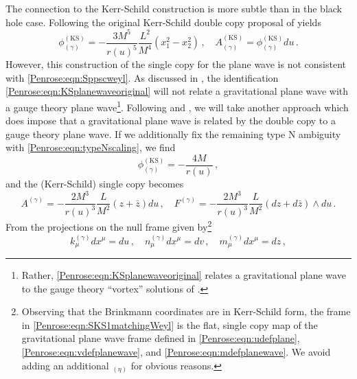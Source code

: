 The connection to the Kerr-Schild construction is more subtle than in the black hole case. Following the original Kerr-Schild double copy proposal of \cite{Monteiro:2014cda} yields
\begin{equation}\label{Penrose:eqn:KSplanewaveoriginal}
\phi_{(\gamma)}^{(\mathrm{KS})} = -\frac{3 M^5}{ r(u)^5}  \frac{L^2}{M^4} (x_1^2 - x_2^2) \, , \quad
A_{(\gamma)}^{(\mathrm{KS})} = 	\phi_{(\gamma)}^{(\mathrm{KS})}  du \, .
\end{equation}
However, this construction of the single copy for the plane wave is not consistent with \eqref{Penrose:eqn:Sppscweyl}. As discussed in \cite{Ilderton:2018lsf, Luna:2018dpt}, the identification \eqref{Penrose:eqn:KSplanewaveoriginal} will not relate a gravitational plane wave with a gauge theory plane wave\footnote{Rather, \eqref{Penrose:eqn:KSplanewaveoriginal} relates a gravitational plane wave to the gauge theory ``vortex'' solutions of \cite{Bialynicki-Birula:2004bvr}.}. Following \cite{Luna:2018dpt} and \cite{Adamo:2017nia}, we will take another approach which does impose that a gravitational plane wave is related by the double copy to a gauge theory plane wave. If we additionally fix the remaining type N ambiguity with \eqref{Penrose:eqn:typeNscaling}, we find
\begin{equation}\label{Penrose:eqn:SKS0matchingWeyl}
\phi_{(\gamma)}^{(\mathrm{KS})} = -\frac{4M}{r(u)} \, ,
\end{equation}
and the (Kerr-Schild) single copy becomes
\begin{equation}\label{Penrose:eqn:SKS1matchingWeyl}
A^{(\gamma)} = -\frac{2 M^3}{r(u)^3}  \frac{L}{M^2} (z + \bar{z}) du \, , \quad  F^{(\gamma)} = -  \frac{2 M^3}{r(u)^3}  \frac{L}{M^2}  ( dz + d\bar{z}) \wedge du \, .
\end{equation} 
From the projections on the null frame given by\footnote{Observing that the Brinkmann coordinates are in Kerr-Schild form, the frame in \eqref{Penrose:eqn:SKS1matchingWeyl} is the flat, single copy map of the gravitational plane wave frame defined in \eqref{Penrose:eqn:udefplane}, \eqref{Penrose:eqn:vdefplanewave}, and \eqref{Penrose:eqn:mdefplanewave}. We avoid adding an additional ${}_{(\eta)}$ for obvious reasons.}
\begin{equation}
k^{(\gamma)}_{\mu} dx^{\mu} =  du  \, , \quad n^{(\gamma)}_{\mu} dx^{\mu} = dv  \, , \quad m^{(\gamma)}_{\mu} dx^{\mu} = dz \, ,
\end{equation}
